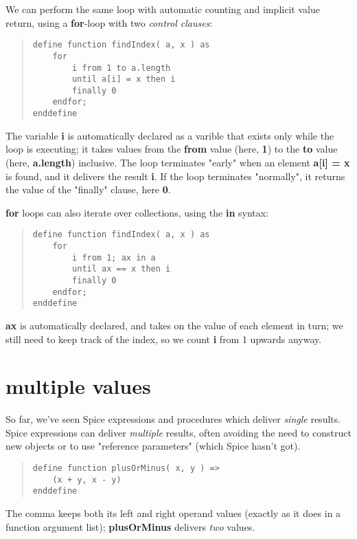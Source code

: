 \documentclass{report}
\begin{document}
We can perform the same loop with automatic counting and implicit value
return, using a {\bf for}-loop with two {\em control clauses}:

\begin{quote}
\begin{verbatim}
define function findIndex( a, x ) as
    for
        i from 1 to a.length
        until a[i] = x then i
        finally 0
    endfor;
enddefine
\end{verbatim}
\end{quote}
The variable {\bf i} is automatically declared as a varible that exists only while
the loop is executing; it takes values from the {\bf from} value (here, {\bf 1}) to
the {\bf to} value (here, {\bf a.length}) inclusive. The loop terminates "early" when
an element {\bf a{[}i{]} = x} is found, and it delivers the result {\bf i}. If the loop
terminates "normally", it returns the value of the "finally" clause, here
{\bf 0}.

{\bf for} loops can also iterate over collections, using the {\bf in} syntax:

\begin{quote}
\begin{verbatim}
define function findIndex( a, x ) as
    for
        i from 1; ax in a
        until ax == x then i
        finally 0
    endfor;
enddefine
\end{verbatim}
\end{quote}
{\bf ax} is automatically declared, and takes on the value of each element in
turn; we still need to keep track of the index, so we count {\bf i} from 1
upwards anyway.\chapter{multiple values}


So far, we've seen Spice expressions and procedures which deliver {\em single}
results. Spice expressions can deliver {\em multiple} results, often avoiding the
need to construct new objects or to use "reference parameters" (which Spice
hasn't got).

\begin{quote}
\begin{verbatim}
define function plusOrMinus( x, y ) =>
    (x + y, x - y)
enddefine
\end{verbatim}
\end{quote}
The comma keeps both its left and right operand values (exactly as it does in
a function argument list); {\bf plusOrMinus} delivers {\em two} values.
\end{document}
